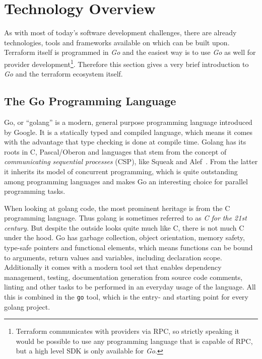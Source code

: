 \documentclass[paper=a4,11pt,numbers=noenddot]{article}
\begin{document}
\section{Technology Overview}
\label{sec:technology-overview}

As with most of today's software development challenges, there are already technologies, tools and frameworks available on which can be built upon. Terraform itself is programmed in \emph{Go} and the easiest way is to use \emph{Go} as well for provider development\footnote{Terraform communicates with providers via RPC, so strictly speaking it would be possible to use any programming language that is capable of RPC, but a high level SDK is only available for \emph{Go}.}. Therefore this section gives a very brief introduction to \emph{Go} and the terraform ecosystem itself.

\subsection{The Go Programming Language}
\label{subsec:go-progr-lang}

Go, or ``golang'' is a modern, general purpose programming language introduced by Google. It is a statically typed and compiled language, which means it comes with the advantage that type checking is done at compile time. Golang has its roots in C, Pascal/Oberon and languages that stem from the concept of \emph{communicating sequential processes} (CSP), like Squeak and Alef~\autocite{donovan_go_2016}. From the latter it inherits its model of concurrent programming, which is quite outstanding among programming languages and makes Go an interesting choice for parallel programming tasks.

When looking at golang code, the most prominent heritage is from the C programming language. Thus golang is sometimes referred to as \emph{C for the 21st century}. But despite the outside looks quite much like C, there is not much C under the hood. Go has garbage collection, object orientation, memory safety, type-safe pointers and functional elements, which means functions can be bound to arguments, return values and variables, including declaration scope. Additionally it comes with a modern tool set that enables dependency management, testing, documentation generation from source code comments, linting and other tasks to be performed in an everyday usage of the language. All this is combined in the \verb'go' tool, which is the entry- and starting point for every golang project.
\end{document}
